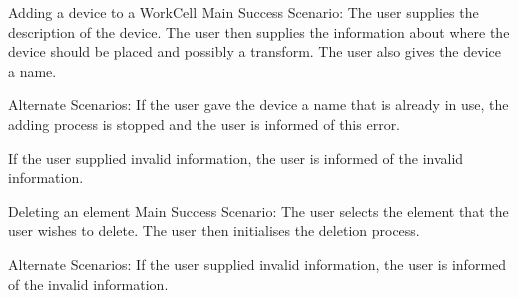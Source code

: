 Adding a device to a WorkCell
Main Success Scenario: The user supplies the description of the device. The user then supplies the information about where the device should be placed and possibly a transform. The user also gives the device a name.

Alternate Scenarios:
If the user gave the device a name that is already in use, the adding process is stopped and the user is informed of this error.

If the user supplied invalid information, the user is informed of the invalid information.

Deleting an element
Main Success Scenario: The user selects the element that the user wishes to delete. The user then initialises the deletion process.

Alternate Scenarios:
If the user supplied invalid information, the user is informed of the invalid information.